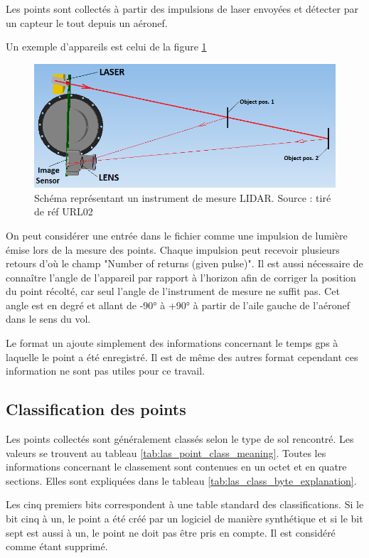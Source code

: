 Les points sont collectés à partir des impulsions de laser envoyées et détecter par un capteur le tout depuis un aéronef.

Un exemple d'appareils est celui de la figure \ref{fig:lidar_scheme}

\begin{figure}[htbp!]
    \centering
    \includegraphics[width=0.8\linewidth]{figures/lidar_schema.png}
    \caption{Schéma représentant un instrument de mesure LIDAR. Source : tiré de réf URL02}
    \label{fig:lidar_scheme}
\end{figure}

On peut considérer une entrée dans le fichier comme une impulsion de lumière émise lors de la mesure des points.
Chaque impulsion peut recevoir plusieurs retours d'où le champ "Number of returns (given pulse)".
Il est aussi nécessaire de connaître l'angle de l'appareil par rapport à l'horizon afin de corriger la position du point récolté, car seul l'angle de l'instrument de mesure ne suffit pas.
Cet angle est en degré et allant de -90° à +90° à partir de l'aile gauche de l'aéronef dans le sens du vol.

Le format un ajoute simplement des informations concernant le temps \gls{gps} à laquelle le point a été enregistré.
Il est de même des autres format cependant ces information ne sont pas utiles pour ce travail.

\subsection{Classification des points}

Les points collectés sont généralement classés selon le type de sol rencontré. Les valeurs se trouvent au tableau \ref{tab:las_point_class_meaning}.
Toutes les informations concernant le classement sont contenues en un octet et  en quatre sections. Elles sont expliquées dans le tableau \ref{tab:las_class_byte_explanation}.

Les cinq premiers bits correspondent à une table standard des classifications.
Si le bit cinq à un, le point a été créé par un logiciel de manière synthétique et si le bit sept est aussi à un, le point ne doit pas être pris en compte. Il est considéré comme étant supprimé.

